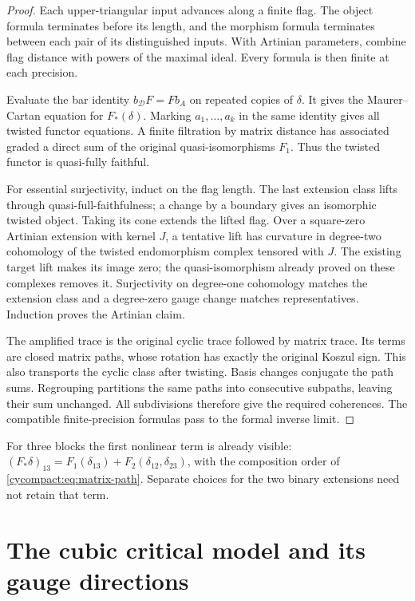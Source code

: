 \begin{proof}
Each upper-triangular input advances along a finite flag.
The object formula terminates before its length, and the
morphism formula terminates between each pair of its
distinguished inputs. With Artinian parameters, combine
flag distance with powers of the maximal ideal. Every
formula is then finite at each precision.

Evaluate the bar identity $b_{\mathcal D}F=Fb_A$ on repeated
copies of $\delta$. It gives the Maurer--Cartan equation
for $F_*(\delta)$. Marking $a_1,\ldots,a_k$ in the same
identity gives all twisted functor equations. A finite
filtration by matrix distance has associated graded a
direct sum of the original quasi-isomorphisms $F_1$.
Thus the twisted functor is quasi-fully faithful.

For essential surjectivity, induct on the flag length.
The last extension class lifts through quasi-full-faithfulness;
a change by a boundary gives an isomorphic twisted object.
Taking its cone extends the lifted flag. Over a square-zero
Artinian extension with kernel $J$, a tentative lift has
curvature in degree-two cohomology of the twisted
endomorphism complex tensored with $J$. The existing
target lift makes its image zero; the quasi-isomorphism
already proved on these complexes removes it.
Surjectivity on degree-one cohomology matches the extension class and
a degree-zero gauge change matches representatives.
Induction proves the Artinian claim.

The amplified trace is the original cyclic trace followed
by matrix trace. Its terms are closed matrix paths, whose
rotation has exactly the original Koszul sign. This also
transports the cyclic class after twisting. Basis changes
conjugate the path sums. Regrouping partitions the same
paths into consecutive subpaths, leaving their sum
unchanged. All subdivisions therefore give the required
coherences. The compatible finite-precision formulas pass
to the formal inverse limit.
\end{proof}

For three blocks the first nonlinear term is already
visible:
$ (F_*\delta)_{13}=F_1(\delta_{13})+
F_2(\delta_{12},\delta_{23})$,
with the composition order of \eqref{cycompact:eq:matrix-path}.
Separate choices for the two binary extensions need not
retain that term.

\section{The cubic critical model and its gauge directions}
\label{cycompact:sec:critical}

